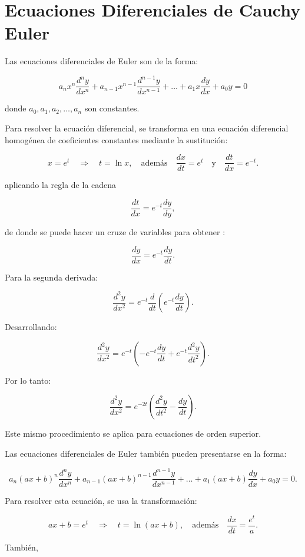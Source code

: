 \section{Ecuaciones Diferenciales de Cauchy Euler}

Las ecuaciones diferenciales de Euler son de la forma:

\[
    a_n x^n \frac{d^n y}{dx^n} + a_{n-1} x^{n-1} \frac{d^{n-1} y}{dx^{n-1}} + \dots + a_1 x \frac{dy}{dx} + a_0 y = 0
\]

donde $a_0, a_1, a_2, \dots, a_n$ son constantes.

Para resolver la ecuación diferencial, se transforma en una ecuación diferencial homogénea de coeficientes constantes mediante la sustitución:

\[
    x = e^t \quad \Rightarrow \quad t = \ln x, \quad \text{además} \quad \frac{dx}{dt} = e^t \quad \text{y} \quad \frac{dt}{dx} = e^{-t}. 
\]

aplicando la regla de la cadena

\[
    \frac{dt}{dx} = e^{-t} \frac{dy}{dy},
\]

de donde se puede hacer un cruze de variables para obtener :

\[
    \frac{dy}{dx} = e^{-t} \frac{dy}{dt}.
\]

Para la segunda derivada:

\[
    \frac{d^2 y}{dx^2} = e^{-t} \frac{d}{dt} \left( e^{-t} \frac{dy}{dt} \right).
\]

Desarrollando:

\[
    \frac{d^2 y}{dx^2} = e^{-t} \left( -e^{-t} \frac{dy}{dt} + e^{-t} \frac{d^2 y}{dt^2} \right).
\]

Por lo tanto:

\[
    \frac{d^2 y}{dx^2} = e^{-2t} \left( \frac{d^2 y}{dt^2} - \frac{dy}{dt} \right).
\]

Este mismo procedimiento se aplica para ecuaciones de orden superior.

Las ecuaciones diferenciales de Euler también pueden presentarse en la forma:

\[
    a_n (ax + b)^n \frac{d^n y}{dx^n} + a_{n-1} (ax + b)^{n-1} \frac{d^{n-1} y}{dx^{n-1}} + \dots + a_1 (ax + b) \frac{dy}{dx} + a_0 y = 0.
\]

Para resolver esta ecuación, se usa la transformación:

\[
    ax + b = e^t \quad \Rightarrow \quad t = \ln (ax + b), \quad \text{además} \quad \frac{dx}{dt} = \frac{e^t}{a}.
\]

También,

